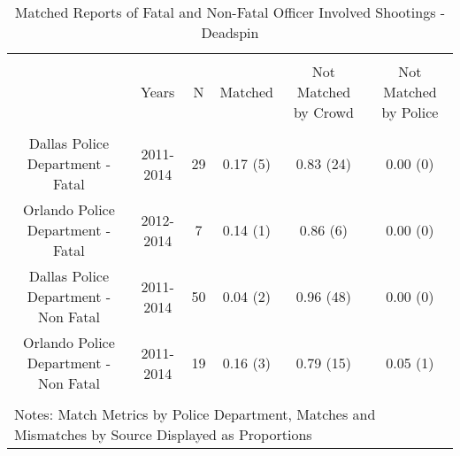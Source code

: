 
\begin{table}[!htbp] \centering 
  \caption{Matched Reports of Fatal and Non-Fatal Officer Involved Shootings - Deadspin} 
  \label{} 
\footnotesize 
\begin{tabular}{@{\extracolsep{5pt}} cccccc} 
\\[-1.8ex]\hline 
\hline \\[-1.8ex] 
 & Years & N & Matched & Not Matched by Crowd & Not Matched by Police \\ 
\hline \\[-1.8ex] 
Dallas Police Department - Fatal & 2011-2014 & 29 & 0.17 (5) & 0.83 (24) & 0.00 (0) \\ 
Orlando Police Department - Fatal & 2012-2014 & 7 & 0.14 (1) & 0.86 (6) & 0.00 (0) \\ 
Dallas Police Department - Non Fatal & 2011-2014 & 50 & 0.04 (2) & 0.96 (48) & 0.00 (0) \\ 
Orlando Police Department - Non Fatal & 2011-2014 & 19 & 0.16 (3) & 0.79 (15) & 0.05 (1) \\ 
\hline \\[-1.8ex] 
\multicolumn{6}{l}{Notes: Match Metrics by Police Department, Matches and Mismatches by Source Displayed as Proportions} \\ 
\end{tabular} 
\end{table}  
